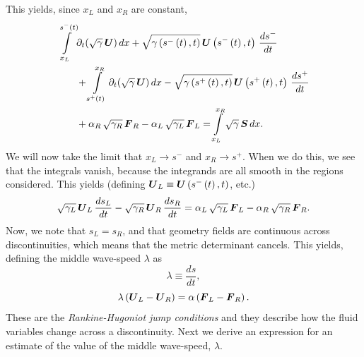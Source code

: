 \documentclass[10pt,preprint]{../aastex}
\begin{document}
This yields, since $x_{L}$ and $x_{R}$ are constant,
\begin{align}
\int\limits_{x_{L}}^{s^{-}\left(t\right)}&\pd{\left(\sqrt{\gamma}\,\bU\right)}{t}\,dx+\sqrt{\gamma\left(s^{-}\left(t\right),t\right)}\,\bU\left(s^{-}\left(t\right),t\right)\,\frac{ds^{-}}{dt}\\
&+\int\limits_{s^{+}\left(t\right)}^{x_{R}}\pd{\left(\sqrt{\gamma}\,\bU\right)}{t}\,dx-\sqrt{\gamma\left(s^{+}\left(t\right),t\right)}\,\bU\left(s^{+}\left(t\right),t\right)\,\frac{ds^{+}}{dt}\\
&+\alpha_{R}\,\sqrt{\gamma_{R}}\,\bF_{R}-\alpha_{L}\,\sqrt{\gamma_{L}}\,\bF_{L}=\int\limits_{x_{L}}^{x_{R}}\sqrt{\gamma}\,\bS\,dx.
\end{align}
We will now take the limit that $x_{L}\longrightarrow s^{-}$ and $x_{R}\longrightarrow s^{+}$. When we do this, we see that the integrals vanish, because the integrands are all smooth in the regions considered. This yields (defining $\bU_{L}\equiv\bU\left(s^{-}\left(t\right),t\right)$, etc.)
\begin{equation}
\sqrt{\gamma_{L}}\,\bU_{L}\,\frac{ds_{L}}{dt}-\sqrt{\gamma_{R}}\,\bU_{R}\,\frac{ds_{R}}{dt}=\alpha_{L}\,\sqrt{\gamma_{L}}\,\bF_{L}-\alpha_{R}\,\sqrt{\gamma_{R}}\,\bF_{R}.
\end{equation}
Now, we note that $s_{L}=s_{R}$, and that geometry fields are continuous across discontinuities, which means that the metric determinant cancels. This yields, defining the middle wave-speed $\lambda$ as
\begin{equation}
\lambda\equiv\frac{ds}{dt},
\end{equation}
\begin{equation}
\lambda\left(\bU_{L}-\bU_{R}\right)=\alpha\left(\bF_{L}-\bF_{R}\right).
\end{equation}
These are the \textit{Rankine-Hugoniot jump conditions} and they describe how the fluid variables change across a discontinuity. Next we derive an expression for an estimate of the value of the middle wave-speed, $\lambda$.
\end{document}
